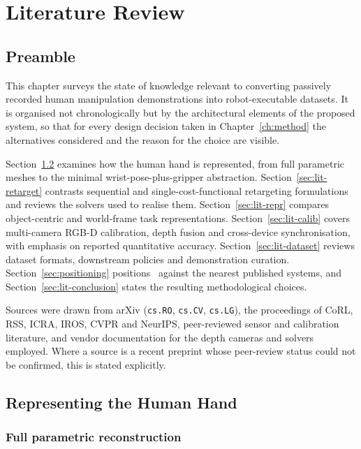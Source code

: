 \chapter{Literature Review}
\label{ch:lit}

\section{Preamble}
\label{sec:lit-preamble}

This chapter surveys the state of knowledge relevant to converting passively
recorded human manipulation demonstrations into robot-executable datasets. It
is organised not chronologically but by the architectural elements of the
proposed system, so that for every design decision taken in
Chapter~\ref{ch:method} the alternatives considered and the reason for the
choice are visible.

Section~\ref{sec:lit-hand} examines how the human hand is represented, from
full parametric meshes to the minimal wrist-pose-plus-gripper abstraction.
Section~\ref{sec:lit-retarget} contrasts sequential and single-cost-functional
retargeting formulations and reviews the solvers used to realise them.
Section~\ref{sec:lit-repr} compares object-centric and world-frame task
representations. Section~\ref{sec:lit-calib} covers multi-camera RGB-D
calibration, depth fusion and cross-device synchronisation, with emphasis on
reported quantitative accuracy. Section~\ref{sec:lit-dataset} reviews dataset
formats, downstream policies and demonstration curation.
Section~\ref{sec:positioning} positions \viki\ against the nearest published
systems, and Section~\ref{sec:lit-conclusion} states the resulting
methodological choices.

Sources were drawn from arXiv (\texttt{cs.RO}, \texttt{cs.CV}, \texttt{cs.LG}),
the proceedings of CoRL, RSS, ICRA, IROS, CVPR and NeurIPS, peer-reviewed
sensor and calibration literature, and vendor documentation for the depth
cameras and solvers employed. Where a source is a recent preprint whose
peer-review status could not be confirmed, this is stated explicitly.

\section{Representing the Human Hand}
\label{sec:lit-hand}

\subsection{Full parametric reconstruction}

